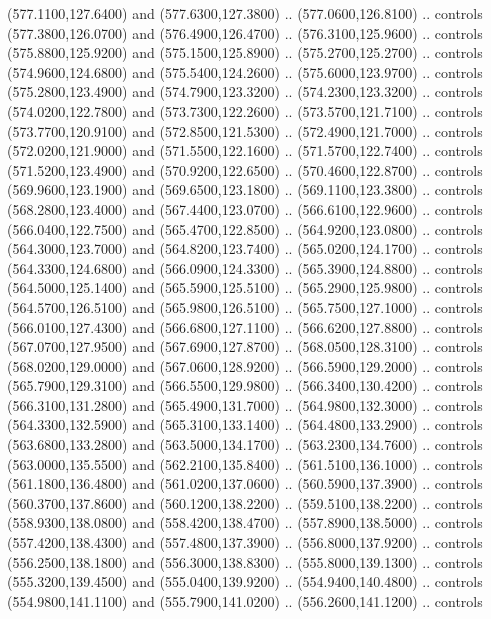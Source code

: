 {\begin{scope}[y=0.80pt, x=0.80pt, yscale=-1, xscale=1, inner sep=0pt, outer sep=0pt, #1]
      (577.1100,127.6400) and (577.6300,127.3800) .. (577.0600,126.8100) .. controls
      (577.3800,126.0700) and (576.4900,126.4700) .. (576.3100,125.9600) .. controls
      (575.8800,125.9200) and (575.1500,125.8900) .. (575.2700,125.2700) .. controls
      (574.9600,124.6800) and (575.5400,124.2600) .. (575.6000,123.9700) .. controls
      (575.2800,123.4900) and (574.7900,123.3200) .. (574.2300,123.3200) .. controls
      (574.0200,122.7800) and (573.7300,122.2600) .. (573.5700,121.7100) .. controls
      (573.7700,120.9100) and (572.8500,121.5300) .. (572.4900,121.7000) .. controls
      (572.0200,121.9000) and (571.5500,122.1600) .. (571.5700,122.7400) .. controls
      (571.5200,123.4900) and (570.9200,122.6500) .. (570.4600,122.8700) .. controls
      (569.9600,123.1900) and (569.6500,123.1800) .. (569.1100,123.3800) .. controls
      (568.2800,123.4000) and (567.4400,123.0700) .. (566.6100,122.9600) .. controls
      (566.0400,122.7500) and (565.4700,122.8500) .. (564.9200,123.0800) .. controls
      (564.3000,123.7000) and (564.8200,123.7400) .. (565.0200,124.1700) .. controls
      (564.3300,124.6800) and (566.0900,124.3300) .. (565.3900,124.8800) .. controls
      (564.5000,125.1400) and (565.5900,125.5100) .. (565.2900,125.9800) .. controls
      (564.5700,126.5100) and (565.9800,126.5100) .. (565.7500,127.1000) .. controls
      (566.0100,127.4300) and (566.6800,127.1100) .. (566.6200,127.8800) .. controls
      (567.0700,127.9500) and (567.6900,127.8700) .. (568.0500,128.3100) .. controls
      (568.0200,129.0000) and (567.0600,128.9200) .. (566.5900,129.2000) .. controls
      (565.7900,129.3100) and (566.5500,129.9800) .. (566.3400,130.4200) .. controls
      (566.3100,131.2800) and (565.4900,131.7000) .. (564.9800,132.3000) .. controls
      (564.3300,132.5900) and (565.3100,133.1400) .. (564.4800,133.2900) .. controls
      (563.6800,133.2800) and (563.5000,134.1700) .. (563.2300,134.7600) .. controls
      (563.0000,135.5500) and (562.2100,135.8400) .. (561.5100,136.1000) .. controls
      (561.1800,136.4800) and (561.0200,137.0600) .. (560.5900,137.3900) .. controls
      (560.3700,137.8600) and (560.1200,138.2200) .. (559.5100,138.2200) .. controls
      (558.9300,138.0800) and (558.4200,138.4700) .. (557.8900,138.5000) .. controls
      (557.4200,138.4300) and (557.4800,137.3900) .. (556.8000,137.9200) .. controls
      (556.2500,138.1800) and (556.3000,138.8300) .. (555.8000,139.1300) .. controls
      (555.3200,139.4500) and (555.0400,139.9200) .. (554.9400,140.4800) .. controls
      (554.9800,141.1100) and (555.7900,141.0200) .. (556.2600,141.1200) .. controls

\end{scope}}
